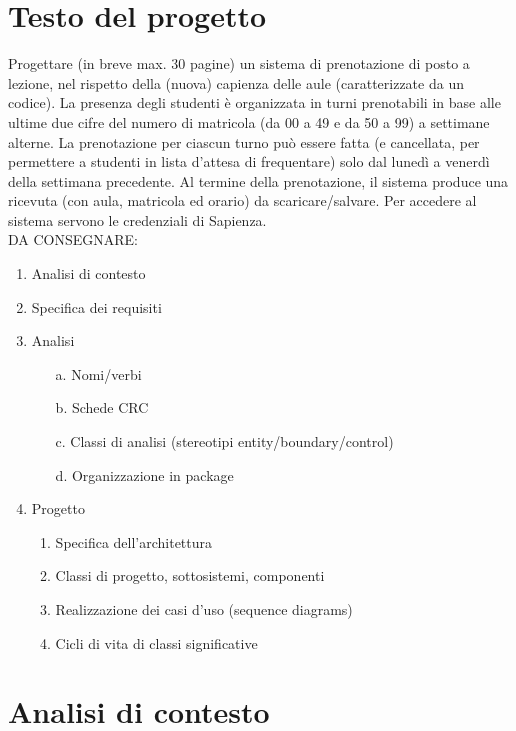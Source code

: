 \chapter{Testo del progetto}
Progettare (in breve max. 30 pagine) un sistema di prenotazione di posto a lezione, nel rispetto della (nuova) capienza delle aule (caratterizzate da un codice). La presenza degli studenti è organizzata in turni prenotabili in base alle ultime due cifre del numero di matricola (da 00 a 49 e da 50 a 99) a settimane alterne. La prenotazione per ciascun turno può essere fatta (e cancellata, per permettere a studenti in lista d’attesa di frequentare) solo dal lunedì a venerdì della settimana precedente. Al termine della prenotazione, il sistema produce una ricevuta (con aula, matricola ed orario) da scaricare/salvare. Per accedere al sistema servono le credenziali di Sapienza.\\
DA CONSEGNARE:
\begin{enumerate}
\item Analisi di contesto
\item Specifica dei requisiti
\item Analisi
\begin {enumerate}
\item[a.] Nomi/verbi
\item[b.] Schede CRC
\item[c.] Classi di analisi (stereotipi entity/boundary/control)
\item[d.] Organizzazione in package
\end{enumerate}
\item Progetto
\begin {enumerate}
\item[a.] Specifica dell’architettura
\item[b.] Classi di progetto, sottosistemi, componenti
\item[c.]  Realizzazione dei casi d’uso (sequence diagrams)
\item[d.] Cicli di vita di classi significative
\end{enumerate}
\end{enumerate}

\chapter{Analisi di contesto}


